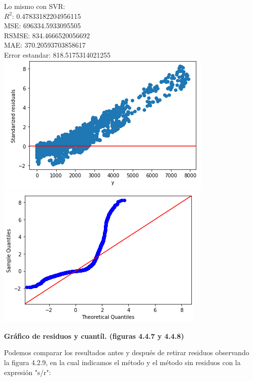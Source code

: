 \documentclass{article}
\begin{document}
        
        Lo mismo con SVR:\\
        
                $R^2$:  0.47833182204956115\\
                MSE:  696334.5933095505\\
                RSMSE:  834.4666520056692\\
                MAE:  370.20593703858617\\
                Error estandar:  818.5175314021255\\
        
        
                \includegraphics[scale=0.6]{images/residuos-discharge-SVR-2.PNG} 
                \includegraphics[scale=0.6]{images/residuos-discharge-SVR-quantil.PNG}
                \begin{center}
                    \textbf{Gráfico de residuos y cuantíl. (figuras 4.4.7 y 4.4.8)}
                \end{center}
        
        Podemos comparar los resultados antes y después de retirar residuos observando la figura 4.2.9, en la cual indicamos el método y el método sin residuos con la expresión "s/r":\\
        
\end{document}
